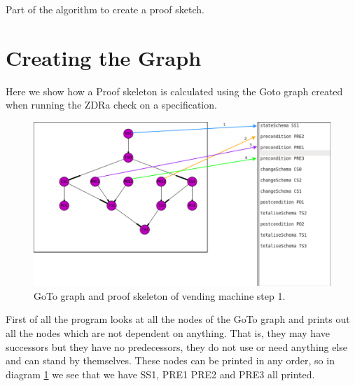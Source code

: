 

\begin{algorithm}[H] 
 \BlankLine
{}  
\caption{Part of the algorithm to create a proof sketch\label{alg:code}.}
\end{algorithm}

\section{Creating the Graph}

Here we show how a Proof skeleton is calculated using the Goto graph created
when running the ZDRa check on a specification.

\begin{figure}[H]
\includegraphics[scale=0.3]{Figures/skeleton/1.png}
\caption{GoTo graph and proof skeleton of vending machine step 1.}
\label{fig:1}
\end{figure}

First of all the program looks at all the nodes of the GoTo graph and prints out
all the nodes which are not dependent on anything. That is, they may have
successors but they have no predecessors, they do not use or need anything else
and can stand by themselves. These nodes can be printed in any order, so in
diagram \ref{fig:1} we see that we have SS1, PRE1 PRE2 and PRE3 all printed.

